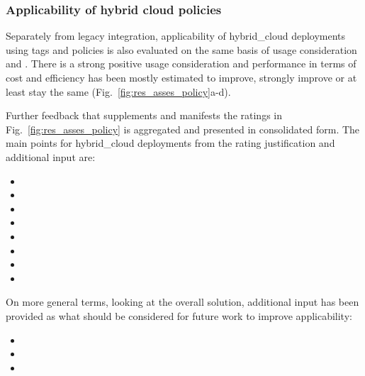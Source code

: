 \documentclass[../main.tex]{subfiles}
\begin{document}
    \subsubsection{Applicability of hybrid cloud policies}

    Separately from legacy integration, applicability of \gls{hybrid_cloud} deployments using tags and policies is also evaluated on the same basis of usage consideration and .
    There is a strong positive usage consideration and performance in terms of cost and efficiency has been mostly estimated to improve, strongly improve or at least stay the same (Fig.~\ref{fig:res_asses_policy}a-d).

    

    Further feedback that supplements and manifests the ratings in Fig.~\ref{fig:res_asses_policy} is aggregated and presented in consolidated form.
    The main points for \gls{hybrid_cloud} deployments from the rating justification and additional input are:
    \begin{itemize}
        \setlength\itemsep{0em}
        \item {}
        \item {}
        \item {}
        \item {}
        \item {}
        \item {}
        \item {}
        \item {}
    \end{itemize}

    On more general terms, looking at the overall solution, additional input has been provided as what should be considered for future work to improve applicability:
    \begin{itemize}
        \setlength\itemsep{0em}
        \item {}
        \item {}
        \item {}
    \end{itemize}
\end{document}

